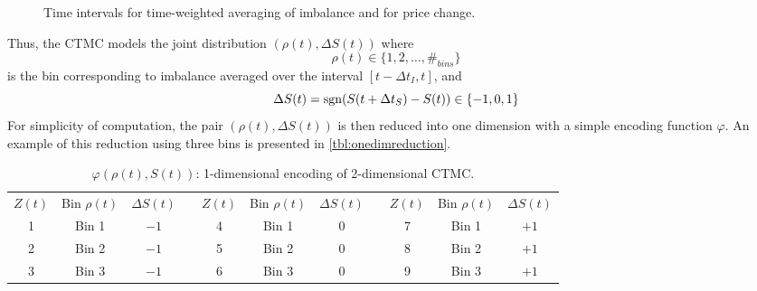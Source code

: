 \begin{figure}[H]
  \centering
  
\caption{Time intervals for time-weighted averaging of imbalance and for price change.}
\label{fig:timewindows}
\end{figure}

Thus, the CTMC models the joint distribution $(\rho(t), \Delta S(t))$ where 
\[ \rho(t) \in \lbrace 1,2,\dots,\#_{bins} \rbrace \]
is the bin corresponding to imbalance averaged over the interval $[t-\Delta t_I, t]$, and
\[ \Delta S(t) = \operatorname{\mathrm{sgn}}(S(t+\Delta t_S)-S(t)) \in \lbrace -1, 0, 1 \rbrace \]
For simplicity of computation, the pair $(\rho(t), \Delta S(t))$ is then reduced into one dimension with a simple encoding function $\varphi$. An example of this reduction using three bins is presented in \autoref{tbl:onedimreduction}.
\begin{table}[H]%
\centering%
%
\caption[1-dimensional encoding of 2-dimensional CTMC]{$\varphi(\rho(t),S(t))$: 1-dimensional encoding of 2-dimensional CTMC.}\label{tbl:onedimreduction}%
\begin{tabular}{@{} *{11}{c} @{}}%
\toprule
$Z(t)$ & Bin $\rho(t)$ & $\Delta S(t)$ & \phantom{abc} & $Z(t)$ & Bin $\rho(t)$ & $\Delta S(t)$ & \phantom{abc} & $Z(t)$ & Bin $\rho(t)$ & $\Delta S(t)$ \\
\cmidrule{1-3} \cmidrule{5-7} \cmidrule{9-11}
1 & Bin 1 & $-1$ && 4 & Bin 1 & $0$ && 7 & Bin 1 & $+1$ \\
2 & Bin 2 & $-1$ && 5 & Bin 2 & $0$ && 8 & Bin 2 & $+1$ \\
3 & Bin 3 & $-1$ && 6 & Bin 3 & $0$ && 9 & Bin 3 & $+1$ \\
\bottomrule%
\end{tabular}%
\end{table}%

